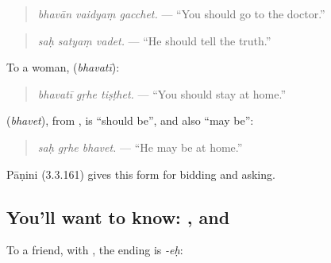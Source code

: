 \begin{quote}
\textbf{  }
\end{quote}

\begin{quote}
\emph{bhavān vaidyaṃ gacchet.} — \textquotedblleft{}You should go to the doctor.\textquotedblright{}
\end{quote}

\begin{quote}
\textbf{  }
\end{quote}

\begin{quote}
\emph{saḥ satyaṃ vadet.} — \textquotedblleft{}He should tell the truth.\textquotedblright{}
\end{quote}

To a woman, \textbf{} (\emph{bhavatī}):

\begin{quote}
\textbf{  }
\end{quote}

\begin{quote}
\emph{bhavatī gṛhe tiṣṭhet.} — \textquotedblleft{}You should stay at home.\textquotedblright{}
\end{quote}

\textbf{} (\emph{bhavet}), from \textbf{}, is \textquotedblleft{}should be\textquotedblright{}, and also \textquotedblleft{}may be\textquotedblright{}:

\begin{quote}
\textbf{  }
\end{quote}

\begin{quote}
\emph{saḥ gṛhe bhavet.} — \textquotedblleft{}He may be at home.\textquotedblright{}
\end{quote}

Pāṇini (3.3.161) gives this form for bidding and asking.

\subsection*{You'll want to know:  , and  }
To a friend, with \textbf{}, the ending is \emph{-eḥ}:

\begin{quote}
\textbf{  }
\end{quote}

